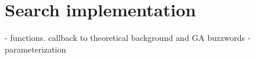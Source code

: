 \section{Search implementation}
- functions. callback to theoretical background and GA buzzwords
- parameterization


\iffalse
    X   Can you describe your implementation in detail? 
    X   Why did you use this technology? 
    X   How does the theory relate to your implementation? 
    X   What are your underlying assumptions? 
    X   What did you neglect and what simplifications have you made? 
    X   What tools and methods did you use? 
    X   Why use these tools and methods? 
\fi